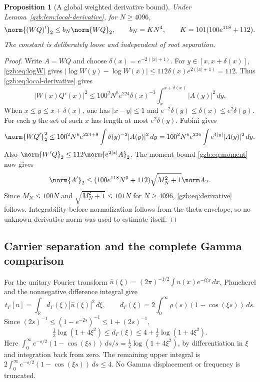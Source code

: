 \documentclass[11pt,a4paper]{article}
\numberwithin{equation}{section}
\newtheorem{proposition}[theorem]{Proposition}
\theoremstyle{definition}\newtheorem{definition}[theorem]{Definition}
\theoremstyle{remark}\newtheorem{remark}[theorem]{Remark}
\newcommand{\R}{\mathbb R}\newcommand{\C}{\mathbb C}\newcommand{\N}{\mathbb N}
\newcommand{\tg}{t_\Gamma}\newcommand{\cg}{c_\Gamma}
\begin{document}
\begin{proposition}[A global weighted derivative bound]\label{gzb:prop:derivative}
Under Lemma~\ref{gzb:lem:local-derivative}, for $N\ge4096$,
\begin{equation}\label{gzb:eq:derivative}
 \norm{(WQ)'}_2\le b_N\norm{WQ}_2,\qquad
 b_N=KN^4,\qquad K=101(100e^{118}+112).
\end{equation}
The constant is deliberately loose and independent of root separation.
\end{proposition}
\begin{proof}
Write $A=WQ$ and choose $\delta(x)=e^{-2(|x|+1)}$.
For $y\in[x,x+\delta(x)]$, \eqref{gzb:eq:logW} gives
$|\log W(y)-\log W(x)|\le112\delta(x)e^{2(|x|+1)}=112$.
Thus \eqref{gzb:eq:local-derivative} gives
\[
 |W(x)Q'(x)|^2
   \le100^2N^6e^{224}\delta(x)^{-3}
                         \int_x^{x+\delta(x)}|A(y)|^2\,dy.
\]
When $x\le y\le x+\delta(x)$, one has $|x-y|\le1$ and
$e^{-2}\delta(y)\le\delta(x)\le e^2\delta(y)$.
For each $y$ the set of such $x$ has length at most $e^2\delta(y)$.
Fubini gives
\[
 \norm{WQ'}_2^2
   \le100^2N^6e^{224+8}\int\delta(y)^{-2}|A(y)|^2\,dy
    =100^2N^6e^{236}\int e^{4|y|}|A(y)|^2\,dy.
\]
Also $\norm{W'Q}_2\le112\norm{e^{2|x|}A}_2$.
The moment bound \eqref{gzb:eq:moment} now gives
\[
 \norm{A'}_2
 \le(100e^{118}N^3+112)\sqrt{M_N^2+1}\norm A_2.
\]
Since $M_N\le100N$ and $\sqrt{M_N^2+1}\le101N$ for $N\ge4096$,
\eqref{gzb:eq:derivative} follows. Integrability before normalization
follows from the theta envelope, so no unknown derivative norm was
used to estimate itself.
\end{proof}

\subsection{Carrier separation and the complete Gamma comparison}
For the unitary Fourier transform
$\widehat u(\xi)=(2\pi)^{-1/2}\int u(x)e^{-i\xi x}\,dx$,
Plancherel and the nonnegative difference integral give
\begin{equation}\label{gzb:eq:gamma-symbol}
 \tg[u]=\int_\R d_\Gamma(\xi)|\widehat u(\xi)|^2\,d\xi,\qquad
 d_\Gamma(\xi)=2\int_0^\infty\rho(s)(1-\cos(\xi s))\,ds.
\end{equation}
Since $(2s)^{-1}\le(1-e^{-2s})^{-1}\le1+(2s)^{-1}$,
\begin{equation}\label{gzb:eq:gamma-bounds}
 \tfrac12\log(1+4\xi^2)\le d_\Gamma(\xi)
                           \le4+\tfrac12\log(1+4\xi^2).
\end{equation}
Here
$\int_0^\infty e^{-s/2}(1-\cos(\xi s))\,ds/s
=\tfrac12\log(1+4\xi^2)$, by differentiation in $\xi$ and integration
back from zero. The remaining upper integral is
$2\int_0^\infty e^{-s/2}(1-\cos(\xi s))\,ds\le4$.
No Gamma displacement or frequency is truncated.
\end{document}
